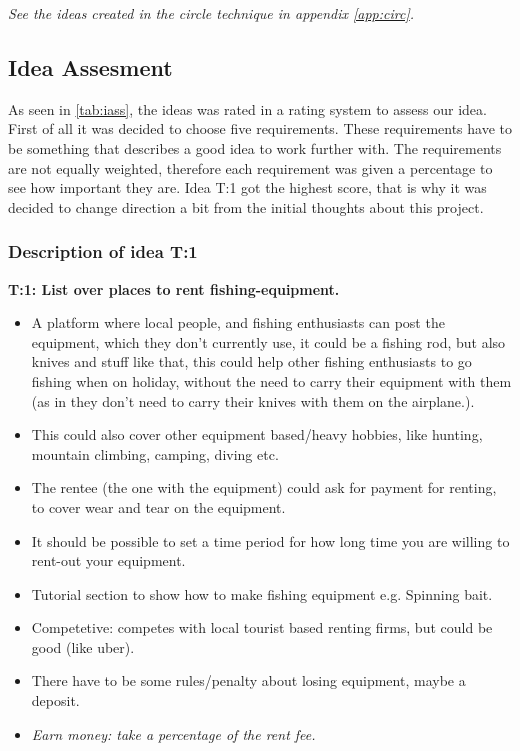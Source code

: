 \textit{See the ideas created in the circle technique in appendix \ref{app:circ}.}

\subsection{Idea Assesment}
As seen in \autoref{tab:iass}, the ideas was rated in a rating system to assess our idea. First of all it was decided to choose five requirements. These requirements have to be something that describes a good idea to work further with. The requirements are not equally weighted, therefore each requirement was given a percentage to see how important they are. Idea T:1 got the highest score, that is why it was decided to change direction a bit from the initial thoughts about this project.

\subsubsection{Description of idea T:1}
{\noindent \textbf{T:1: List over places to rent fishing-equipment.}}
\begin{itemize}
	\item A platform where local people, and fishing enthusiasts can post the equipment, which they don’t currently use, it could be a fishing rod, but also knives and stuff like that, this could help other fishing enthusiasts to go fishing when on holiday, without the need to carry their equipment with them (as in they don’t need to carry their knives with them on the airplane.). 
	\item This could also cover other equipment based/heavy hobbies, like hunting, mountain climbing, camping, diving etc.
	\item The rentee (the one with the equipment) could ask for payment for renting, to cover wear and tear on the equipment.
	\item It should be possible to set a time period for how long time you are willing to rent-out your equipment. 
	\item Tutorial section to show how to make fishing equipment e.g. Spinning bait.
	\item Competetive: competes with local tourist based renting firms, but could be good (like uber).
	\item There have to be some rules/penalty about losing equipment, maybe a deposit.
	\item \textit{Earn money: take a percentage of the rent fee. }
\end{itemize}
\vspace{2em}



